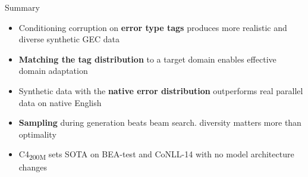 \documentclass[aspectratio=169]{beamer}
\begin{document}

\begin{frame}{Summary}
  \begin{itemize}
    \item Conditioning corruption on \textbf{error type tags} produces
      more realistic and diverse synthetic GEC data\\[0.8em]
    \item \textbf{Matching the tag distribution} to a target domain enables
      effective domain adaptation\\[0.8em]
    \item Synthetic data with the \textbf{native error distribution}
      outperforms real parallel data on native English\\[0.8em]
    \item \textbf{Sampling} during generation beats beam search.
      diversity matters more than optimality\\[0.8em]
    \item C4\textsubscript{200M} sets SOTA on BEA-test and CoNLL-14
      with no model architecture changes
  \end{itemize}
\end{frame}
\end{document}
